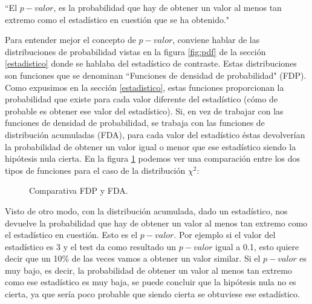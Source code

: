 \begin{center}
``El $p-valor$, es la probabilidad que hay de obtener un valor al menos tan extremo como el estadístico en cuestión
que se ha obtenido."
\end{center}

Para entender mejor el concepto de $p-valor$, conviene hablar de las distribuciones de probabilidad vistas en la
figura \ref{fig:pdf} de la sección \ref{estadistico} donde se hablaba del estadístico de contraste. Estas
distribuciones son funciones que se denominan ``Funciones de densidad de probabilidad" (FDP). Como expusimos en
la sección \ref{estadistico}, estas funciones proporcionan la probabilidad que existe para cada valor
diferente del estadístico (cómo de probable es obtener ese valor del estadístico). Si, en vez de trabajar con las
funciones de densidad de probabilidad, se trabaja con las funciones de distribución acumuladas (FDA), para cada
valor del estadístico éstas devolverían la probabilidad de obtener un valor igual o menor que ese estadístico siendo
la hipótesis nula cierta. En la figura \ref{fig:comparativa_pdf_cdf} podemos ver una comparación entre los dos
tipos de funciones para el caso de la distribución $\chi^2$:

\begin{figure}[h]
\centering
{}
\caption{Comparativa FDP y FDA.}
\label{fig:comparativa_pdf_cdf}
\end{figure}

Visto de otro modo, con la distribución acumulada, dado un estadístico, nos devuelve la probabilidad que hay de
obtener un valor al menos tan extremo como el estadístico en cuestión. Esto es el \textbf{$p-valor$}. Por ejemplo si
el valor del estadístico es 3 y el test da como resultado un $p-valor$ igual a 0.1, esto quiere decir que un 10\% de
las veces vamos a obtener un valor similar. Si el $p-valor$ es muy bajo, es decir, la probabilidad de obtener un valor
al menos tan extremo como ese estadístico es muy baja, se puede concluir que la hipótesis nula no es cierta, ya que
sería poco probable que siendo cierta se obtuviese ese estadístico.

